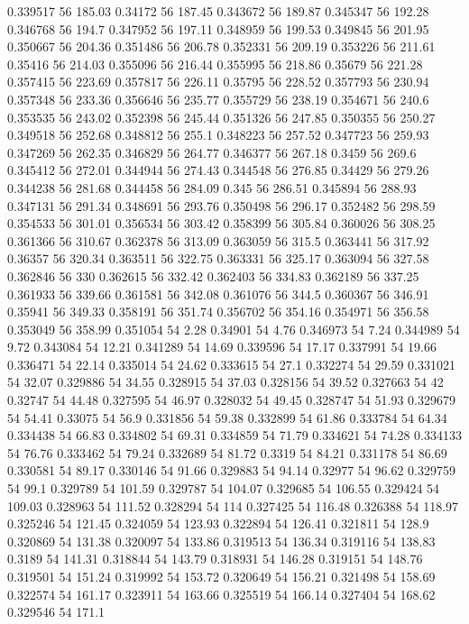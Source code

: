 0.339517 56 185.03
0.34172 56 187.45
0.343672 56 189.87
0.345347 56 192.28
0.346768 56 194.7
0.347952 56 197.11
0.348959 56 199.53
0.349845 56 201.95
0.350667 56 204.36
0.351486 56 206.78
0.352331 56 209.19
0.353226 56 211.61
0.35416 56 214.03
0.355096 56 216.44
0.355995 56 218.86
0.35679 56 221.28
0.357415 56 223.69
0.357817 56 226.11
0.35795 56 228.52
0.357793 56 230.94
0.357348 56 233.36
0.356646 56 235.77
0.355729 56 238.19
0.354671 56 240.6
0.353535 56 243.02
0.352398 56 245.44
0.351326 56 247.85
0.350355 56 250.27
0.349518 56 252.68
0.348812 56 255.1
0.348223 56 257.52
0.347723 56 259.93
0.347269 56 262.35
0.346829 56 264.77
0.346377 56 267.18
0.3459 56 269.6
0.345412 56 272.01
0.344944 56 274.43
0.344548 56 276.85
0.34429 56 279.26
0.344238 56 281.68
0.344458 56 284.09
0.345 56 286.51
0.345894 56 288.93
0.347131 56 291.34
0.348691 56 293.76
0.350498 56 296.17
0.352482 56 298.59
0.354533 56 301.01
0.356534 56 303.42
0.358399 56 305.84
0.360026 56 308.25
0.361366 56 310.67
0.362378 56 313.09
0.363059 56 315.5
0.363441 56 317.92
0.36357 56 320.34
0.363511 56 322.75
0.363331 56 325.17
0.363094 56 327.58
0.362846 56 330
0.362615 56 332.42
0.362403 56 334.83
0.362189 56 337.25
0.361933 56 339.66
0.361581 56 342.08
0.361076 56 344.5
0.360367 56 346.91
0.35941 56 349.33
0.358191 56 351.74
0.356702 56 354.16
0.354971 56 356.58
0.353049 56 358.99
0.351054 54 2.28
0.34901 54 4.76
0.346973 54 7.24
0.344989 54 9.72
0.343084 54 12.21
0.341289 54 14.69
0.339596 54 17.17
0.337991 54 19.66
0.336471 54 22.14
0.335014 54 24.62
0.333615 54 27.1
0.332274 54 29.59
0.331021 54 32.07
0.329886 54 34.55
0.328915 54 37.03
0.328156 54 39.52
0.327663 54 42
0.32747 54 44.48
0.327595 54 46.97
0.328032 54 49.45
0.328747 54 51.93
0.329679 54 54.41
0.33075 54 56.9
0.331856 54 59.38
0.332899 54 61.86
0.333784 54 64.34
0.334438 54 66.83
0.334802 54 69.31
0.334859 54 71.79
0.334621 54 74.28
0.334133 54 76.76
0.333462 54 79.24
0.332689 54 81.72
0.3319 54 84.21
0.331178 54 86.69
0.330581 54 89.17
0.330146 54 91.66
0.329883 54 94.14
0.32977 54 96.62
0.329759 54 99.1
0.329789 54 101.59
0.329787 54 104.07
0.329685 54 106.55
0.329424 54 109.03
0.328963 54 111.52
0.328294 54 114
0.327425 54 116.48
0.326388 54 118.97
0.325246 54 121.45
0.324059 54 123.93
0.322894 54 126.41
0.321811 54 128.9
0.320869 54 131.38
0.320097 54 133.86
0.319513 54 136.34
0.319116 54 138.83
0.3189 54 141.31
0.318844 54 143.79
0.318931 54 146.28
0.319151 54 148.76
0.319501 54 151.24
0.319992 54 153.72
0.320649 54 156.21
0.321498 54 158.69
0.322574 54 161.17
0.323911 54 163.66
0.325519 54 166.14
0.327404 54 168.62
0.329546 54 171.1
